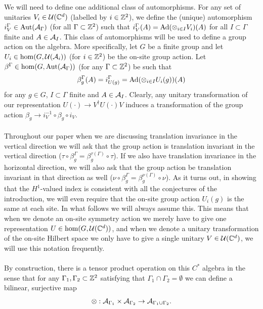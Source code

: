 \documentclass[11pt,a4paper,twoside]{article}
\numberwithin{equation}{section}
\begin{document}
	We will need to define one additional class of automorphisms. For any set of unitaries $V_i\in\UU(\CC^d)$ (labelled by $i\in\ZZ^2$), we define the (unique) automorphism $i_V^\Gamma\in\Aut{\AA_\Gamma}$ (for all $\Gamma\subset \ZZ^2$) such that $i_V^\Gamma (A)=\Ad{\otimes_{i\in I} V_i}(A)$ for all $I\subset\Gamma$ finite and $A\in\AA_I$. This class of automorphisms will be used to define a group action on the algebra. More specifically, let $G$ be a finite group and let $U_i\in\hom(G,\UU(\AA_i))$ (for $i\in\ZZ^2$) be the on-site group action. Let $\beta^\Gamma\in\hom(G,\Aut{\AA_\Gamma})$ (for any $\Gamma\subset\ZZ^2$) be such that
	\begin{equation}
		\beta^\Gamma_g(A)=i_{U(g)}^\Gamma=\Ad{\otimes_{i\in I} U_i(g)}(A)
	\end{equation}
	for any $g\in G$, $I\subset\Gamma$ finite and $A\in\AA_I$. Clearly, any unitary transformation of our representation $U(\cdot)\rightarrow V^\dagger U(\cdot) V$ induces a transformation of the group action $\beta_g\rightarrow i_{V}^{-1}\circ\beta_g\circ i_V$.\\\\
	Throughout our paper when we are discussing translation invariance in the vertical direction we will ask that the group action is translation invariant in the vertical direction ($\tau\circ\beta_g^\Gamma=\beta_g^{\tau(\Gamma)}\circ\tau$). If we also have translation invariance in the horizontal direction, we will also ask that the group action be translation invariant in that direction as well ($\nu\circ\beta_g^\Gamma=\beta_g^{\nu(\Gamma)}\circ\nu$). As it turns out, in showing that the $H^1$-valued index is consistent with all the conjectures of the introduction, we will even require that the on-site group action $U_i(g)$ is the same at each site. In what follows we will always assume this. This means that when we denote an on-site symmetry action we merely have to give one representation $U\in\hom(G,\UU(\CC^d))$, and when we denote a unitary transformation of the on-site Hilbert space we only have to give a single unitary $V\in \UU(\CC^d)$, we will use this notation frequently.\\\\
	By construction, there is a tensor product operation on this $C^*$ algebra in the sense that for any $\Gamma_1,\Gamma_2\subset\ZZ^2$ satisfying that $\Gamma_1\cap\Gamma_2=\emptyset$ we can define a bilinear, surjective map
	\begin{equation}
		\otimes:\AA_{\Gamma_1}\times\AA_{\Gamma_2}\rightarrow \AA_{\Gamma_1\cup\Gamma_2}.
	\end{equation}
\end{document}
